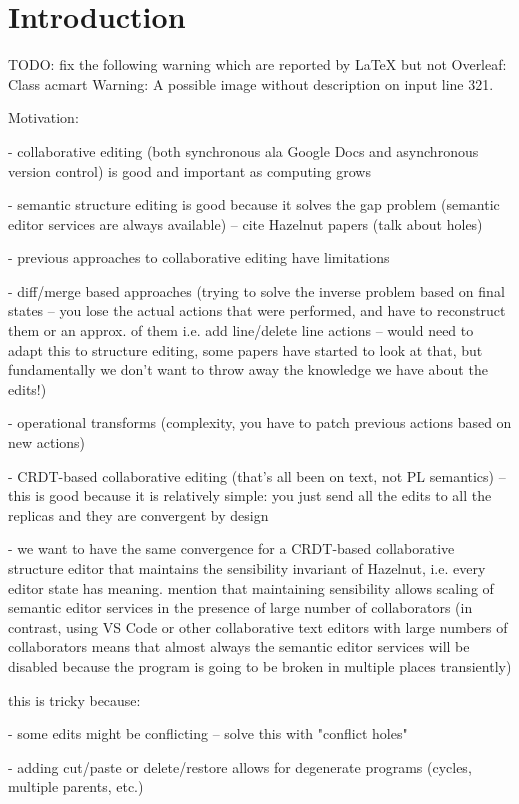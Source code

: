 
\section{Introduction}%
\label{sec:Introduction}

TODO: fix the following warning which are reported by LaTeX but not Overleaf: Class acmart Warning: A possible image without description on input line 321.

Motivation:

- collaborative editing (both synchronous ala Google Docs and asynchronous version control)
is good and important as computing grows

- semantic structure editing is good because it solves the gap problem (semantic editor services
are always available) -- cite Hazelnut papers (talk about holes)

- previous approaches to collaborative editing have limitations

- diff/merge based approaches (trying to solve the inverse problem based on final states --
you lose the actual actions that were performed, and have to reconstruct them or an approx.
of them i.e. add line/delete line actions -- would need to adapt this to structure editing,
some papers have started to look at that, but fundamentally we don't want to throw away the
knowledge we have about the edits!)

- operational transforms (complexity, you have to patch previous actions based on new actions)

- CRDT-based collaborative editing (that's all been on text, not PL semantics) -- this is good
because it is relatively simple: you just send all the edits to all the replicas and they are
convergent by design

- we want to have the same convergence for a CRDT-based collaborative structure editor that maintains
the sensibility invariant of Hazelnut, i.e. every editor state has meaning. mention that maintaining sensibility
allows scaling of semantic editor services in the presence of large number of collaborators (in contrast,
using VS Code or other collaborative text editors with large numbers of collaborators means that almost always
the semantic editor services will be disabled because the program is going to be broken in multiple places
transiently)

this is tricky because:

- some edits might be conflicting -- solve this with "conflict holes"

- adding cut/paste or delete/restore allows for degenerate programs (cycles, multiple parents, etc.)

